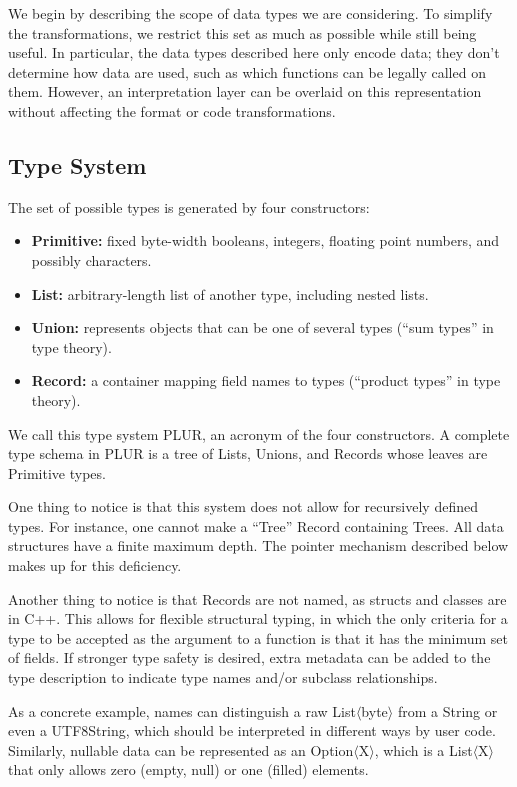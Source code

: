 \documentclass[10pt, conference, compsocconf]{IEEEtran}
\begin{document}
We begin by describing the scope of data types we are considering. To simplify the transformations, we restrict this set as much as possible while still being useful. In particular, the data types described here only encode data; they don't determine how data are used, such as which functions can be legally called on them. However, an interpretation layer can be overlaid on this representation without affecting the format or code transformations.

\subsection{Type System}
\label{type-system}

The set of possible types is generated by four constructors:
\begin{itemize}
\item {\bf Primitive:} fixed byte-width booleans, integers, floating point numbers, and possibly characters.
\item {\bf List:} arbitrary-length list of another type, including nested lists.
\item {\bf Union:} represents objects that can be one of several types (``sum types'' in type theory).
\item {\bf Record:} a container mapping field names to types (``product types'' in type theory).
\end{itemize}
We call this type system PLUR, an acronym of the four constructors. A complete type schema in PLUR is a tree of Lists, Unions, and Records whose leaves are Primitive types.

One thing to notice is that this system does not allow for recursively defined types. For instance, one cannot make a ``Tree'' Record containing Trees. All data structures have a finite maximum depth. The pointer mechanism described below makes up for this deficiency.

Another thing to notice is that Records are not named, as structs and classes are in C++. This allows for flexible structural typing, in which the only criteria for a type to be accepted as the argument to a function is that it has the minimum set of fields. If stronger type safety is desired, extra metadata can be added to the type description to indicate type names and/or subclass relationships.

As a concrete example, names can distinguish a raw List$\langle$byte$\rangle$ from a String or even a UTF8String, which should be interpreted in different ways by user code. Similarly, nullable data can be represented as an Option$\langle$X$\rangle$, which is a List$\langle$X$\rangle$ that only allows zero (empty, null) or one (filled) elements.
\end{document}
